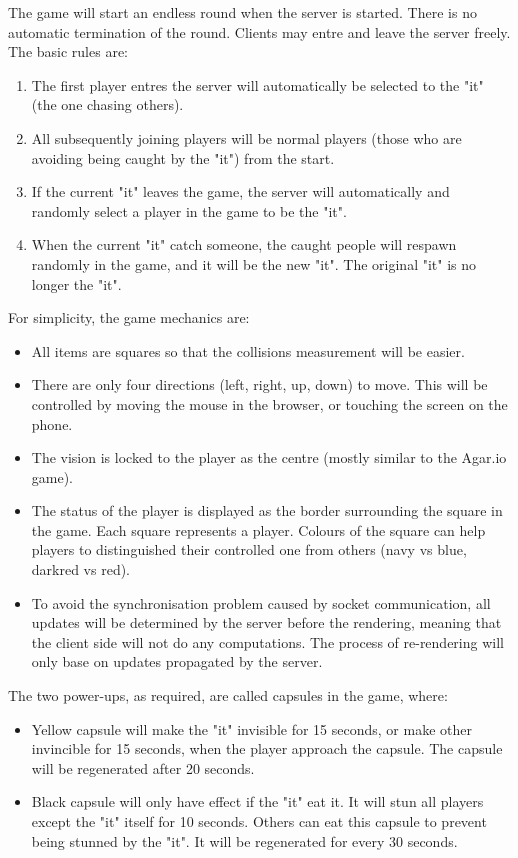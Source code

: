 \documentclass[12pt]{article}
\begin{document}
The game will start an endless round when the server is started. There is no automatic termination of the round. Clients may entre and leave the server freely. The basic rules are:

\begin{enumerate}
  \item The first player entres the server will automatically be selected to the "it" (the one chasing others).
  \item All subsequently joining players will be normal players (those who are avoiding being caught by the "it") from the start.
  \item If the current "it" leaves the game, the server will automatically and randomly select a player in the game to be the "it".
  \item When the current "it" catch someone, the caught people will respawn randomly in the game, and it will be the new "it". The original "it" is no longer the "it".
\end{enumerate}

For simplicity, the game mechanics are:

\begin{itemize}
  \item All items are squares so that the collisions measurement will be easier.
  \item There are only four directions (left, right, up, down) to move. This will be controlled by moving the mouse in the browser, or touching the screen on the phone.
  \item The vision is locked to the player as the centre (mostly similar to the Agar.io game).
  \item The status of the player is displayed as the border surrounding the square in the game. Each square represents a player. Colours of the square can help players to distinguished their controlled one from others (navy vs blue, darkred vs red).
  \item To avoid the synchronisation problem caused by socket communication, all updates will be determined by the server before the rendering, meaning that the client side will not do any computations. The process of re-rendering will only base on updates propagated by the server.
\end{itemize}

The two power-ups, as required, are called capsules in the game, where:

\begin{itemize}
  \item Yellow capsule will make the "it" invisible for 15 seconds, or make other invincible for 15 seconds, when the player approach the capsule. The capsule will be regenerated after 20 seconds.
  \item Black capsule will only have effect if the "it" eat it. It will stun all players except the "it" itself for 10 seconds. Others can eat this capsule to prevent being stunned by the "it". It will be regenerated for every 30 seconds.
\end{itemize}
\end{document}
